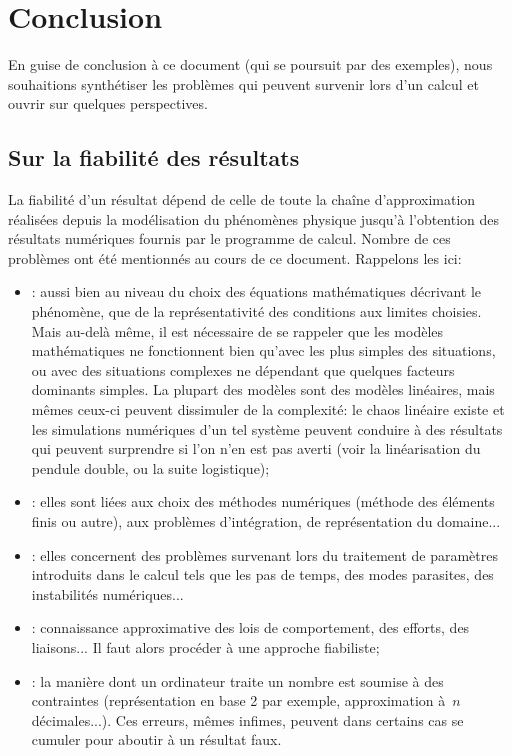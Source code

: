 \chapter*{Conclusion}\label{Ch-Ccl}

En guise de conclusion à ce document (qui se poursuit par des exemples), nous souhaitions synthétiser les problèmes qui peuvent survenir lors d'un calcul et ouvrir sur quelques perspectives.


\medskip
\section*{Sur la fiabilité des résultats}

La fiabilité d'un résultat dépend de celle de toute la chaîne d'approximation réalisées depuis la modélisation du phénomènes physique jusqu'à l'obtention des résultats numériques fournis par le programme de calcul. Nombre de ces problèmes ont été mentionnés au cours de ce document. Rappelons les ici:
\begin{itemize}
  \item {}: aussi bien au niveau du choix des équations mathématiques décrivant le phénomène, que de la représentativité des conditions aux limites choisies. Mais au-delà même, il est nécessaire de se rappeler que les modèles mathématiques ne fonctionnent bien qu'avec les plus simples des situations, ou avec des situations complexes ne dépendant que quelques facteurs dominants simples. La plupart des modèles sont des modèles linéaires, mais mêmes ceux-ci peuvent dissimuler de la complexité: le chaos linéaire existe et les simulations numériques d'un tel système peuvent conduire à des résultats qui peuvent surprendre si l'on n'en est pas averti (voir la linéarisation du pendule double, ou la suite logistique);
  \item {}: elles sont liées aux choix des méthodes numériques (méthode des éléments finis ou autre), aux problèmes d'intégration, de représentation du domaine...
  \item {}: elles concernent des problèmes survenant lors du traitement de paramètres introduits dans le calcul tels que les pas de temps, des modes parasites, des instabilités numériques...
  \item {}: connaissance approximative des lois de comportement, des efforts, des liaisons... Il faut alors procéder à une approche fiabiliste;
  \item {}: la manière dont un ordinateur traite un nombre est soumise à des contraintes (représentation en base 2 par exemple, approximation à~$n$ décimales...). Ces erreurs, mêmes infimes, peuvent dans certains cas se cumuler pour aboutir à un résultat faux.
\end{itemize}


